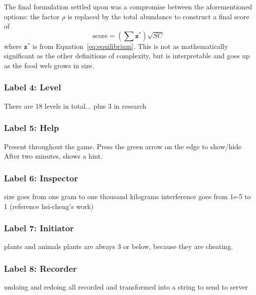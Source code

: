 The final formulation settled upon was a compromise between the aforementioned options: the factor $\rho$ is replaced by the total abundance to construct a final score of
\begin{equation}
  \mathrm{score} = \left(\sum\mathbf{z^*}\right)\sqrt{SC}
\end{equation}
where $\mathbf{z^*}$ is from Equation~\eqref{eq:equilibrium}. This is not as mathematically significant as the other definitions of complexity, but is interpretable and goes up as the food web grows in size.

\subsubsection{Label 4: Level}
There are 18 levels in total... plus 3 in research

\subsubsection{Label 5: Help}
Present throughout the game.
Press the green arrow on the edge to show/hide
After two minutes, shows a hint.

\subsubsection{Label 6: Inspector}
size goes from one gram to one thousand kilograms
interference goes from 1e-5 to 1 (reference hsi-cheng's work)

\subsubsection{Label 7: Initiator}
plants and animals
plants are always 3 or below, because they are cheating.

\subsubsection{Label 8: Recorder}
undoing and redoing
all recorded and transformed into a string to send to server


